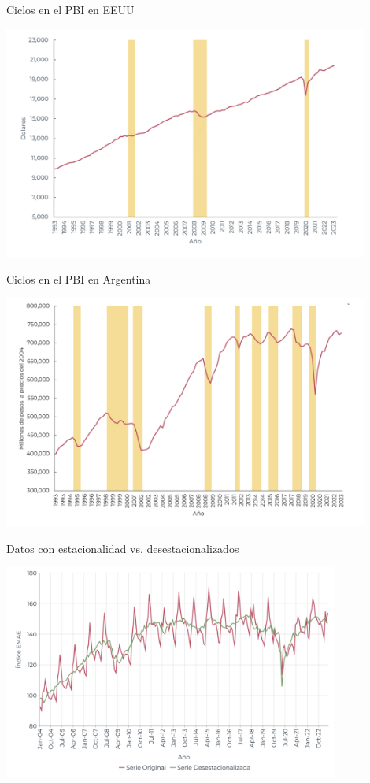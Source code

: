 \documentclass{beamer}
\begin{document}
\begin{frame}{Ciclos en el PBI en EEUU}

\centering\includegraphics[width=12cm]{Slides Principios de Economia/Figures/32.8.pdf}\

\end{frame}

\begin{frame}{Ciclos en el PBI en Argentina}

\centering\includegraphics[width=12cm]{Slides Principios de Economia/Figures/32.9.pdf}\

\end{frame}

\begin{frame}{Datos con estacionalidad vs. desestacionalizados}

\centering\includegraphics[width=11cm]{Slides Principios de Economia/Figures/32.14.pdf}\

\end{frame}
\end{document}
